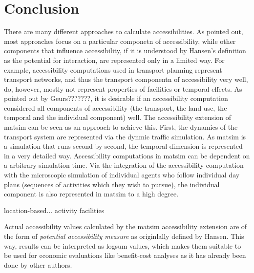 \section{Conclusion}
There are many different approaches to calculate accessibilities. As pointed out, most approaches focus on a particular 
componetn of accessibility, while other components that influence accessibility, if it is understood by Hansen's definition 
as the potential for interaction, are represented only in a limited way. For example, accessibility computations used in 
transport planning represent transport networks, and thus the transport componentn of accessibility very well, do, however, 
mostly not represent properties of facilities or temporal effects. As pointed out by Geurs???????, it is desirable if an 
accessibility computation considered all components of accessibility (the transport, the land use, the temporal and the 
individual component) well. The accessibility extension of \gls{matsim} can be seen as an approach to achieve this. First, 
the dynamics of the transport system are represented via the dynmic traffic simulation. As \gls{matsim} is a simulation 
that runs second by second, the temporal dimension is represented in a very detailed way. Accessibility computations in 
\gls{matsim} can be dependent on a arbitrary simulation time. Via the integration of the accessibility computation with 
the microscopic simulation of individual agents who follow individual day plans (sequences of activities which they 
wish to pursue), the individual component is also represented in \gls{matsim} to a high degree.

location-based... activity facilities

Actual accessibility values calculated by the \gls{matsim} accessibility extension are of the form of \textit{potential 
	accessibility measure} as originlally defined by Hansen. This way, results can be interpreted as logsum values, 
which makes them suitable to be used for economic evaluations like benefit-cost analyses as it has already been done 
by other authors.




